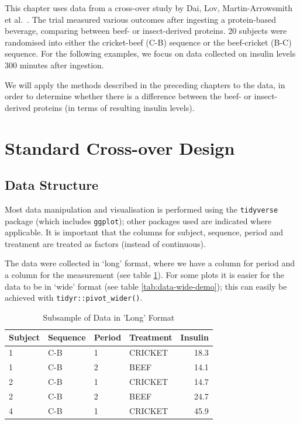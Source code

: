 This chapter uses data from a cross-over study by Dai, Lov,
Martin-Arrowsmith et al.~\cite{dai2022insect}. The trial measured
various outcomes after ingesting a protein-based beverage, comparing
between beef- or insect-derived proteins. 20 subjects were randomised
into either the cricket-beef (C-B) sequence or the beef-cricket (B-C)
sequence. For the following examples, we focus on data collected on
insulin levels 300 minutes after ingestion.

We will apply the methods described in the preceding chapters to the
data, in order to determine whether there is a difference between the
beef- or insect-derived proteins (in terms of resulting insulin levels).

\section{Standard Cross-over Design}\label{standard-cross-over-design}

\subsection{Data Structure}\label{data-structure}

Most data manipulation and visualisation is performed using the
\texttt{tidyverse} package (which includes \texttt{ggplot}); other
packages used are indicated where applicable. It is important that the
columns for subject, sequence, period and treatment are treated as
factors (instead of continuous).

The data were collected in `long' format, where we have a column for
period and a column for the measurement (see table
\ref{tab:data-long-demo}). For some plots it is easier for the data to
be in `wide' format (see table \ref{tab:data-wide-demo}); this can
easily be achieved with \texttt{tidyr::pivot\_wider()}.

\begin{table}
\centering
\caption{\label{tab:data-long-demo}Subsample of Data in 'Long' Format}
\centering
\begin{tabular}[t]{llllr}
\toprule
Subject & Sequence & Period & Treatment & Insulin\\
\midrule
1 & C-B & 1 & CRICKET & 18.3\\
1 & C-B & 2 & BEEF & 14.1\\
2 & C-B & 1 & CRICKET & 14.7\\
2 & C-B & 2 & BEEF & 24.7\\
4 & C-B & 1 & CRICKET & 45.9\\
\bottomrule
\end{tabular}
\end{table}

